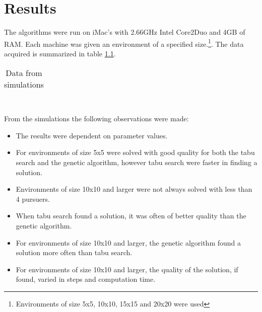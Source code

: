 \chapter{Results}
The algorithms were run on iMac's with 2.66GHz Intel Core2Duo and 4GB of RAM. Each machine was given an environment of a specified size.\footnote{Environments of size 5x5, 10x10, 15x15 and 20x20 were used}. The data acquired is summarized in table \ref{SimData}.
\begin{table}[t!hb]
\begin{tabular}{| c | r | r | r | r | r | r | r | r | }
\hline
 
\hline
\end{tabular}
\caption{Data from simulations}
\label{SimData}
\end{table}
\\ From the simulations the following observations were made:
\begin{itemize}
\item{The results were dependent on parameter values.}
\item{For environments of size 5x5 were solved with good quality for both the tabu search and the genetic algorithm, however tabu search were faster in finding a solution.}
\item{Environments of size 10x10 and larger were not always solved with less than 4 pursuers.}
\item{When tabu search found a solution, it was often of better quality than the genetic algorithm.}
\item{For environments of size 10x10 and larger, the genetic algorithm found a solution more often than tabu search.}
\item{For environments of size 10x10 and larger, the quality of the solution, if found, varied in steps and computation time.}
\end{itemize}

